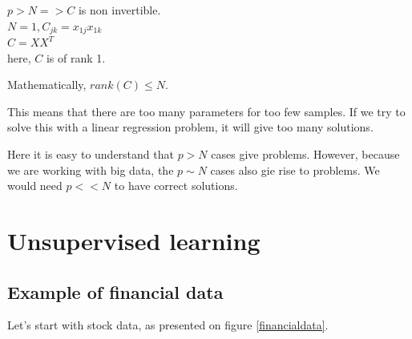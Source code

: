 \TODO

$p>N => C$ is non invertible.\\
$N = 1, C_{jk} = x_{1j} x_{1k}$\\
$C = XX^T$ \\
here, $C$ is of rank 1.


Mathematically, $rank(C)\leq N$.

This means that there are too many parameters for too few samples. If we try to
solve this with a linear regression problem, it will give too many solutions.


Here it is easy to understand that $p>N$ cases give problems. However, because
we are working with big data, the $p\sim N$ cases also gie rise to problems. We
would need $p<< N$ to have correct solutions.

\section{Unsupervised learning}
\subsection{Example of financial data}

Let's start with stock data, as presented on figure \ref{financialdata}.

